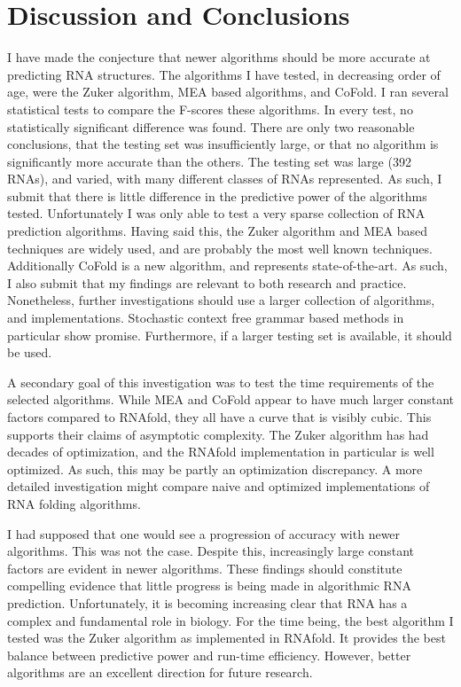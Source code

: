 \documentclass[12pt, a4paper]{article}
\begin{document}
\section{Discussion and Conclusions}
I have made the conjecture that newer algorithms should be more accurate at predicting RNA structures. The algorithms I have tested, in decreasing order of age, were the Zuker algorithm, MEA based algorithms, and CoFold. I ran several statistical tests to compare the F-scores these algorithms. In every test, no statistically significant difference was found. There are only two reasonable conclusions, that the testing set was insufficiently large, or that no algorithm is significantly more accurate than the others. The testing set was large (392 RNAs), and varied, with many different classes of RNAs represented. As such, I submit that there is little difference in the predictive power of the algorithms tested. Unfortunately I was only able to test a very sparse collection of RNA prediction algorithms. Having said this, the Zuker algorithm and MEA based techniques are widely used, and are probably the most well known techniques. Additionally CoFold is a new algorithm, and represents state-of-the-art. As such, I also submit that my findings are relevant to both research and practice. Nonetheless, further investigations should use a larger collection of algorithms, and implementations. Stochastic context free grammar based methods in particular show promise. Furthermore, if a larger testing set is available, it should be used.

A secondary goal of this investigation was to test the time requirements of the selected algorithms. While MEA and CoFold appear to have much larger constant factors compared to RNAfold, they all have a curve that is visibly cubic. This supports their claims of asymptotic complexity. The Zuker algorithm has had decades of optimization, and the RNAfold implementation in particular is well optimized. As such, this may be partly an optimization discrepancy. A more detailed investigation might compare naive and optimized implementations of RNA folding algorithms.

I had supposed that one would see a progression of accuracy with newer algorithms. This was not the case. Despite this, increasingly large constant factors are evident in newer algorithms. These findings should constitute compelling evidence that little progress is being made in algorithmic RNA prediction. Unfortunately, it is becoming increasing clear that RNA has a complex and fundamental role in biology. For the time being, the best algorithm I tested was the Zuker algorithm as implemented in RNAfold. It provides the best balance between predictive power and run-time efficiency. However, better algorithms are an excellent direction for future research.





\end{document}
